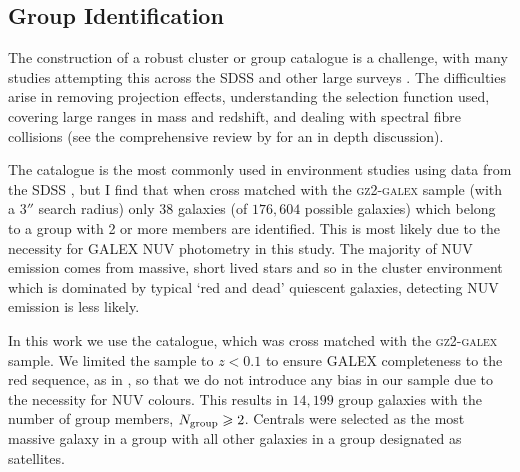 \documentclass[useAMS,usenatbib]{mn2e}
\begin{document}
\subsection{Group Identification}\label{sec:groups}

The construction of a robust cluster or group catalogue is a challenge, with many studies attempting this across the SDSS \citep{merchan05, miller05, berlind06, yang07, tago08, tago10, tinker11, munoz12, tempel14} and other large surveys \citep{tucker00, merchan02, eke04, cucciati10, robotham11, knobel12}. The difficulties arise in removing projection effects, understanding the selection function used, covering large ranges in mass and redshift, and dealing with spectral fibre collisions (see the comprehensive review by \citet{postman02} for an in depth discussion). 

The \citeauthor{yang07} catalogue is the most commonly used in environment studies using data from the SDSS \citep[including][]{hoyle11, pasquali12, wetzel14, shankar14, lacerna14, knobel15, fitzpatrick15, lan16, woo16, bluck16, weigel16}, but I find that when cross matched with the \textsc{gz2-galex} sample (with a $3''$ search radius) only $38$ galaxies (of $176,604$ possible galaxies) which belong to a group with 2 or more members are identified. This is most likely due to the necessity for GALEX NUV photometry in this study. The majority of NUV emission comes from massive, short lived stars and so in the cluster environment which is dominated by typical `red and dead' quiescent galaxies, detecting NUV emission is less likely. 

In this work we use the \citet{berlind06} catalogue, which was cross matched with the \textsc{gz2-galex} sample. We limited the sample to $z < 0.1$ to ensure GALEX completeness to the red sequence, as in \citealt{wyder07, yesuf14}, so that we do not introduce any bias in our sample due to the necessity for NUV colours. This results in $14,199$ group galaxies with the number of group members, $N_{\rm{group}} \geq 2$. Centrals were selected as the most massive galaxy in a group \citep[as in][]{yang07, yang09, pasquali10} with all other galaxies in a group designated as satellites.
\end{document}
